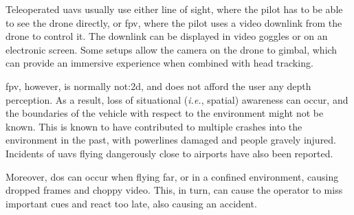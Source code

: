 Teleoperated \glspl{uav} usually use either line of sight, where the pilot has to be able to see the drone directly, or \gls{fpv}, where the pilot uses a video downlink from the drone to control it.
The downlink can be displayed in video goggles or on an electronic screen.
Some setups allow the camera on the drone to gimbal, which can provide an immersive experience when combined with head tracking.

\gls{fpv}, however, is normally \gls{not:2d}, and does not afford the user any depth perception.
As a result, loss of situational (\emph{i.e.}, spatial) awareness can occur, and the boundaries of the vehicle with respect to the environment might not be known.
This is known to have contributed to multiple crashes into the environment in the past, with powerlines damaged and people gravely injured.
Incidents of \glspl{uav} flying dangerously close to airports have also been reported.

Moreover, \gls{dos} can occur when flying far, or in a confined environment, causing dropped frames and choppy video.
This, in turn, can cause the operator to miss important cues and react too late, also causing an accident.
